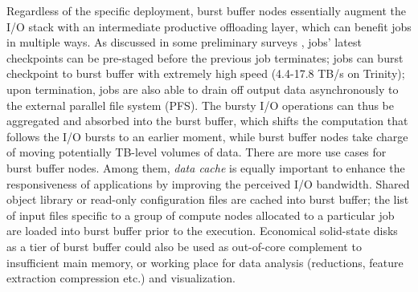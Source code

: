 

Regardless of the specific deployment, burst buffer nodes essentially augment
the I/O stack with an intermediate productive offloading layer, 
which can benefit jobs in multiple ways.
As discussed in some preliminary surveys\cite{apex-workflow} ,
jobs' latest checkpoints can be pre-staged
before the previous job terminates;
jobs can burst checkpoint to burst buffer
with extremely high speed (4.4-17.8 TB/s on Trinity);
upon termination, jobs are also able to drain off output data
asynchronously to the external parallel file system (PFS).
The bursty I/O operations can thus be aggregated and absorbed into the burst buffer,
which shifts the computation that follows the I/O bursts to an earlier moment,
while burst buffer nodes take charge of moving potentially TB-level volumes of data.
There are more use cases for burst buffer nodes.
Among them, \textit{data cache} is equally important to enhance the responsiveness
of applications by improving the perceived I/O bandwidth\cite{TrinitySystem}.
Shared object library or read-only configuration files are cached into burst buffer;
the list of input files specific to a group of compute nodes allocated to
a particular job are loaded into burst buffer prior to the execution.
Economical solid-state disks as a tier of burst buffer could also be used as
out-of-core complement to insufficient main memory\cite{Romanus:CORR:15},
or working place for data analysis (reductions, feature extraction compression etc.)
and visualization\cite{TrinitySystem}.
